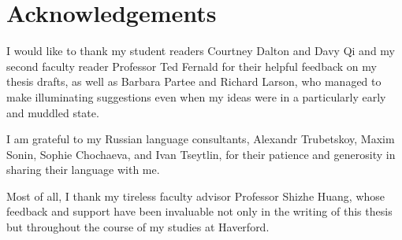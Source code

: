 \section*{Acknowledgements}
I would like to thank my student readers Courtney Dalton and Davy Qi and my second faculty reader Professor Ted Fernald for their helpful feedback on my thesis drafts, as well as Barbara Partee and Richard Larson, who managed to make illuminating suggestions even when my ideas were in a particularly early and muddled state.

I am grateful to my Russian language consultants, Alexandr Trubetskoy, Maxim Sonin, Sophie Chochaeva, and Ivan Tseytlin, for their patience and generosity in sharing their language with me.

Most of all, I thank my tireless faculty advisor Professor Shizhe Huang, whose feedback and support have been invaluable not only in the writing of this thesis but throughout the course of my studies at Haverford.